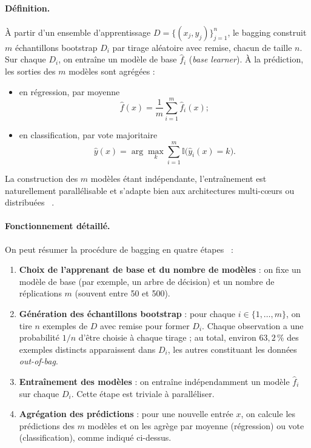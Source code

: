 \paragraph{Définition.}
À partir d'un ensemble d'apprentissage $D = \{(x_j, y_j)\}_{j=1}^n$, le bagging construit $m$
échantillons bootstrap $D_i$ par tirage aléatoire avec remise, chacun de taille $n$. Sur chaque
$D_i$, on entraîne un modèle de base $\hat{f}_i$ (\emph{base learner}). À la prédiction, les sorties
des $m$ modèles sont agrégées :
\begin{itemize}
  \item en régression, par moyenne
  \[
    \hat{f}(x) = \frac{1}{m} \sum_{i=1}^m \hat{f}_i(x) ;
  \]
  \item en classification, par vote majoritaire
  \[
    \hat{y}(x) = \arg\max_k \sum_{i=1}^m \mathbb{I}\bigl(\hat{y}_i(x) = k\bigr).
  \]
\end{itemize}

La construction des $m$ modèles étant indépendante, l'entraînement est naturellement
parallélisable et s'adapte bien aux architectures multi-c\oe urs ou distribuées
~\cite{mlm_bagging_vs_boosting_vs_stacking,ibm_bagging}.

\paragraph{Fonctionnement détaillé.}
On peut résumer la procédure de bagging en quatre étapes~\cite{breiman_bagging_1996,eric_td4_ensemble} :
\begin{enumerate}
  \item \textbf{Choix de l'apprenant de base et du nombre de modèles} : on fixe un modèle de base
  (par exemple, un arbre de décision) et un nombre de réplications $m$ (souvent entre 50 et 500).

  \item \textbf{Génération des échantillons bootstrap} : pour chaque $i \in \{1,\dots,m\}$, on tire $n$
  exemples de $D$ avec remise pour former $D_i$. Chaque observation a une probabilité
  $1/n$ d'être choisie à chaque tirage ; au total, environ $63{,}2\,\%$ des exemples distincts
  apparaissent dans $D_i$, les autres constituant les données \emph{out-of-bag}.

  \item \textbf{Entraînement des modèles} : on entraîne indépendamment un modèle $\hat{f}_i$ sur chaque
  $D_i$. Cette étape est triviale à paralléliser.

  \item \textbf{Agrégation des prédictions} : pour une nouvelle entrée $x$, on calcule les prédictions
  des $m$ modèles et on les agrège par moyenne (régression) ou vote (classification), comme
  indiqué ci-dessus.
\end{enumerate}

